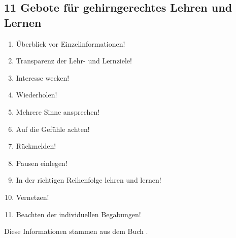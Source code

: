 \subsection{11 Gebote für gehirngerechtes Lehren und Lernen}
\begin{enumerate}
  \item Überblick vor Einzelinformationen!
  \item Transparenz der Lehr- und Lernziele!
  \item Interesse wecken!
  \item Wiederholen!
  \item Mehrere Sinne ansprechen!
  \item Auf die Gefühle achten!
  \item Rückmelden!
  \item Pausen einlegen!
  \item In der richtigen Reihenfolge lehren und lernen!
  \item Vernetzen!
  \item Beachten der individuellen Begabungen!
\end{enumerate}

Diese Informationen stammen aus dem Buch \cite{kopf}.